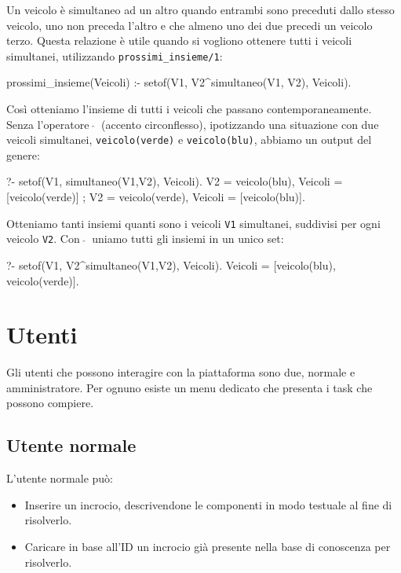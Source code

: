 Un veicolo è simultaneo ad un altro quando entrambi sono preceduti dallo stesso veicolo, uno non preceda l'altro e che almeno uno dei due precedi un veicolo terzo. Questa relazione è utile quando si vogliono ottenere tutti i veicoli simultanei, utilizzando \texttt{prossimi\_insieme/1}:
\begin{verbatimtab}
prossimi_insieme(Veicoli) :-
	setof(V1, V2^simultaneo(V1, V2), Veicoli).
\end{verbatimtab}

Così otteniamo l'insieme di tutti i veicoli che passano contemporaneamente. Senza l'operatore $\ \widehat{}\ $ (accento circonflesso), ipotizzando una situazione con due veicoli simultanei, \texttt{veicolo(verde)} e \texttt{veicolo(blu)}, abbiamo un output del genere:

\begin{verbatimtab}
?- setof(V1, simultaneo(V1,V2), Veicoli).
V2 = veicolo(blu),
Veicoli = [veicolo(verde)] ;
V2 = veicolo(verde),
Veicoli = [veicolo(blu)].
\end{verbatimtab}

Otteniamo tanti insiemi quanti sono i veicoli \texttt{V1} simultanei, suddivisi per ogni veicolo \texttt{V2}. Con $\ \widehat{}\ $ uniamo tutti gli insiemi in un unico set:

\begin{verbatimtab}
?- setof(V1, V2^simultaneo(V1,V2), Veicoli).
Veicoli = [veicolo(blu), veicolo(verde)].
\end{verbatimtab}

\section{Utenti}
\label{sec:users}
Gli utenti che possono interagire con la piattaforma sono due, normale e amministratore. Per ognuno esiste un menu dedicato che presenta i task che possono compiere.

\subsection{Utente normale}
L'utente normale può:
\begin{itemize}
	\item Inserire un incrocio, descrivendone le componenti in modo testuale al fine di risolverlo.
	\item Caricare in base all'ID un incrocio già presente nella base di conoscenza per risolverlo.
\end{itemize}

